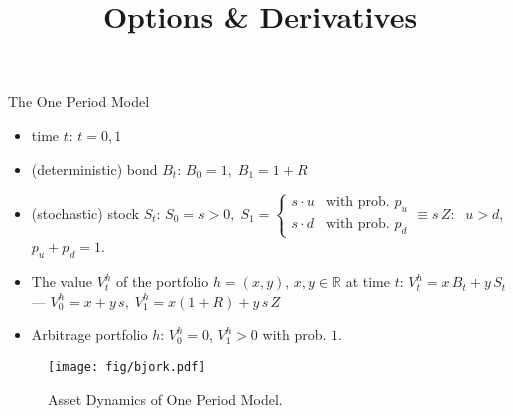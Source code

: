 \documentclass[10pt,handout]{beamer}
\title{Options \& Derivatives}
\author{}
\date{}
\newcommand{\ds}{\displaystyle}
\theoremstyle{definition}
\begin{document}
\begin{frame}
\titlepage
\end{frame}


\begin{frame}{The One Period Model}
  \begin{itemize}
    \item time $t$: $t=0, 1$ 
    \item (deterministic) bond $B_t$: $\ds B_0 = 1,\;B_1 = 1 + R$
    \item (stochastic) stock $S_t$: $\ds S_0 = s > 0, \; S_1 = \begin{cases} s\cdot u & \text{with prob. } p_u\\ s\cdot d & \text{with prob. } p_d \end{cases} \equiv s\,Z:\;$ $u > d$, $p_u + p_d = 1$.
    \item The value $V_t^h$ of the portfolio $h=(x, y),\,x, y\in\mathbb{R}$ at time $t$: $\ds V_t^h = x\,B_t + y\,S_t$ --- $\ds V_0^h = x + y\,s,\; V_1^h = x(1 + R) + y\,s\,Z$
    \item Arbitrage portfolio $h$: $V_0^h=0$, $V_1^h>0$ with prob. $1$.
  \end{itemize}
  \begin{figure}[!htbp]
    \centering
    \texttt{[image: fig/bjork.pdf]}
    \caption{Asset Dynamics of One Period Model.}
    \label{fig:bn1}
  \end{figure}
\end{frame}
\end{document}
